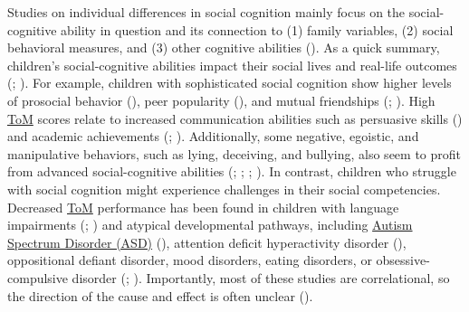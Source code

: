 \documentclass[
]{scrbook}
\begin{document}
Studies on individual differences in social cognition mainly focus on the social-cognitive ability in question and its connection to (1) family variables, (2) social behavioral measures, and (3) other cognitive abilities (). As a quick summary, children's social-cognitive abilities impact their social lives and real-life outcomes (; ). For example, children with sophisticated social cognition show higher levels of prosocial behavior (), peer popularity (), and mutual friendships (; ). High \hyperref[acronyms_ToM]{ToM} scores relate to increased communication abilities such as persuasive skills () and academic achievements (; ). Additionally, some negative, egoistic, and manipulative behaviors, such as lying, deceiving, and bullying, also seem to profit from advanced social-cognitive abilities (; ; ; ). In contrast, children who struggle with social cognition might experience challenges in their social competencies. Decreased \hyperref[acronyms_ToM]{ToM} performance has been found in children with language impairments (; ) and atypical developmental pathways, including \hyperref[acronyms_ASD]{Autism Spectrum Disorder (ASD)} (), attention deficit hyperactivity disorder (), oppositional defiant disorder, mood disorders, eating disorders, or obsessive-compulsive disorder (; ). Importantly, most of these studies are correlational, so the direction of the cause and effect is often unclear ().
\end{document}

